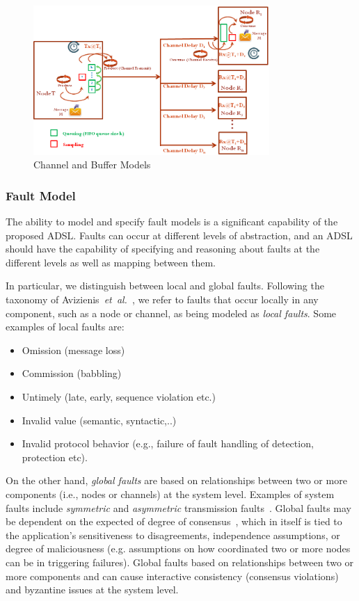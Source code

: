 \begin{figure}
\begin{center}
\includegraphics[width=0.8\textwidth]{figures/channel_buffer.png}
\caption{Channel and Buffer Models}
\label{fig:channel_buffer}
\end{center}
\end{figure}

\subsubsection{Fault Model}

The ability to model and specify fault models is a  significant capability
of the proposed ADSL. Faults can occur at different levels of abstraction, and an ADSL should have the capability of specifying and reasoning about faults at the different levels as well as mapping between them.

In particular, we distinguish between local and global faults.
Following the taxonomy of Avizienis~\emph{et~al.}~\cite{taxonomy},
we refer to faults that occur locally in any component, such as a node or channel, as being modeled as \emph{local faults}. Some examples of
local faults are:
\begin{itemize}
  \item Omission (message loss)
  \item Commission (babbling)
  \item Untimely (late, early, sequence violation etc.)
  \item Invalid value (semantic, syntactic,..)
  \item Invalid protocol behavior (e.g., failure of fault handling of detection,
protection etc).
\end{itemize}

On the other hand, \emph{global faults} are based on relationships between
two or more components (i.e., nodes or channels) at the system level. Examples of system
faults include \emph{symmetric} and \emph{asymmetric} transmission faults~\cite{Tha88:RDSS}. Global faults
may be dependent on the expected of degree of consensus~\cite{lynch}, which in itself is
tied to the application's sensitiveness to disagreements, independence assumptions, or degree of maliciousness (e.g. assumptions on how coordinated two or more nodes can be in triggering failures). Global faults based on relationships between two or more components and can cause interactive consistency (consensus violations) and byzantine issues at the system level.


